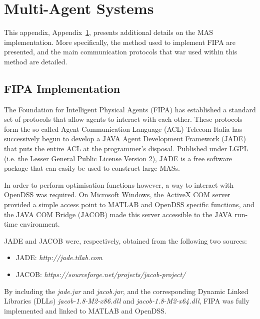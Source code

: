 \chapter{Multi-Agent Systems}
\label{appx-b:multi-agent-systems}

This appendix, Appendix~\ref{appx-b:multi-agent-systems}, presents additional details on the MAS implementation.
More specifically, the method used to implement FIPA are presented, and the main communication protocols that war used within this method are detailed.

\section{FIPA Implementation}


The Foundation for Intelligent Physical Agents (FIPA) has established a standard set of protocols that allow agents to interact with each other.
These protocols form the so called Agent Communication Language (ACL)
Telecom Italia has successively begun to develop a JAVA Agent Development Framework (JADE) that puts the entire ACL at the programmer's disposal.
Published under LGPL (i.e. the Lesser General Public License Version 2), JADE is a free software package that can easily be used to construct large MASs.

In order to perform optimisation functions however, a way to interact with OpenDSS was required.
On Microsoft Windows, the ActiveX COM server provided a simple access point to MATLAB and OpenDSS specific functions, and the JAVA COM Bridge (JACOB) made this server accessible to the JAVA run-time environment.

JADE and JACOB were, respectively, obtained from the following two sources:

\begin{itemize}
	\item JADE: \textit{http://jade.tilab.com}
	\item JACOB: \textit{https://sourceforge.net/projects/jacob-project/}
\end{itemize}

By including the \textit{jade.jar} and \textit{jacob.jar}, and the corresponding Dynamic Linked Libraries (DLLs) \textit{jacob-1.8-M2-x86.dll} and  \textit{jacob-1.8-M2-x64.dll}, FIPA was fully implemented and linked to MATLAB and OpenDSS.

